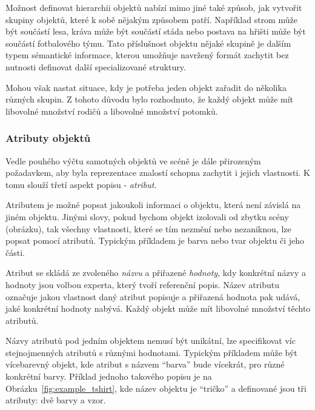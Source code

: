 Možnost definovat hierarchii objektů nabízí mimo jiné také způsob, jak vytvořit skupiny objektů, které k sobě nějakým způsobem patří.
Například strom může být součástí lesa, kráva může být součástí stáda nebo postava na hřišti může být součástí fotbalového týmu.
Tato příslušnost objektu nějaké skupině je dalším typem sémantické informace, kterou umožňuje navržený formát zachytit bez nutnosti definovat další specializované struktury.

Mohou však nastat situace, kdy je potřeba jeden objekt zařadit do několika různých skupin.
Z tohoto důvodu bylo rozhodnuto, že každý objekt může mít libovolné množství rodičů a libovolné množství potomků.

\subsubsection{Atributy objektů}
Vedle pouhého výčtu samotných objektů ve scéně je dále přirozeným požadavkem, aby byla reprezentace znalostí schopna zachytit i jejich vlastnosti.
K tomu slouží třetí aspekt popisu - \emph{atribut}.

Atributem je možné popsat jakoukoli informaci o objektu, která není závislá na jiném objektu.
Jinými slovy, pokud bychom objekt izolovali od zbytku scény (obrázku), tak všechny vlastnosti, které se tím nezmění nebo nezaniknou, lze popsat pomocí atributů.
Typickým příkladem je barva nebo tvar objektu či jeho části.

Atribut se skládá ze zvoleného \emph{názvu} a přiřazené \emph{hodnoty}, kdy konkrétní názvy a hodnoty jsou volbou experta, který tvoří referenční popis.
Název atributu označuje jakou vlastnost daný atribut popisuje a přiřazená hodnota pak udává, jaké konkrétní hodnoty nabývá.
Každý objekt může mít libovolné množství těchto atributů.

Názvy atributů pod jedním objektem nemusí být unikátní, lze specifikovat víc stejnojmenných atributů s různými hodnotami.
Typickým příkladem může být vícebarevný objekt, kde atribut s názvem \enquote{barva} bude vícekrát, pro různé konkrétní barvy.
Příklad jednoho takového popisu je na Obrázku~\ref{fig:example_tshirt}, kde název objektu je \enquote{tričko}
a definované jsou tři atributy: dvě barvy a vzor.


